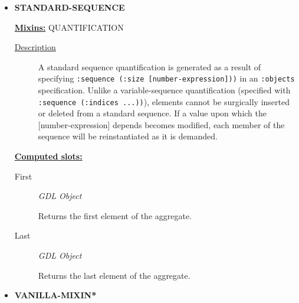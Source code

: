 \documentclass [11pt]{book}
\begin{document}
\begin{itemize}
\begin{description}
\end{description}









\item {}
\textbf{STANDARD-SEQUENCE}


\textbf{
\underline{Mixins:}} QUANTIFICATION





\begin{description}

\item [
\underline{Description}]


A standard sequence quantification is generated as a result of specifying 
\texttt{:sequence (:size [number-expression]))} in an \texttt{:objects} specification. Unlike a variable-sequence 
quantification (specified with \texttt{:sequence (:indices ...))}), elements cannot be surgically inserted or 
deleted from a standard sequence. If a value upon which the [number-expression] depends becomes modified,
each member of the sequence will be reinstantiated as it is demanded.



\end{description}








\textbf{
\underline{Computed slots:}}

\begin{description}

\item [First]
\emph{GDL Object}

 Returns the first element of the aggregate.




\item [Last]
\emph{GDL Object}

 Returns the last element of the aggregate.




\end{description}







\item {}
\textbf{VANILLA-MIXIN*}



\end{itemize}
\end{document}
